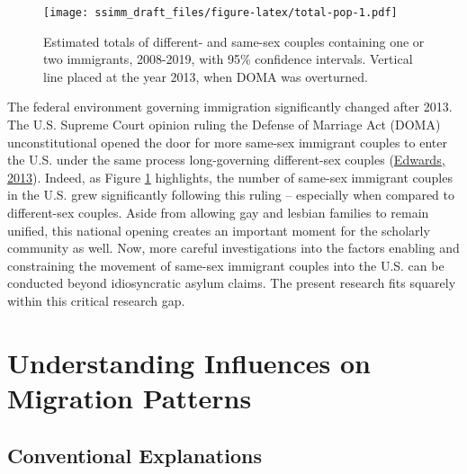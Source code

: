 \documentclass[
  11pt,
]{article}
\begin{document}
\begin{figure}
\centering
\texttt{[image: ssimm\_draft\_files/figure-latex/total-pop-1.pdf]}
\caption{\label{fig:total-pop}Estimated totals of different- and same-sex couples containing one or two immigrants, 2008-2019, with 95\% confidence intervals. Vertical line placed at the year 2013, when DOMA was overturned.}
\end{figure}

The federal environment governing immigration significantly changed after 2013. The U.S. Supreme Court opinion ruling the Defense of Marriage Act (DOMA) unconstitutional opened the door for more same-sex immigrant couples to enter the U.S. under the same process long-governing different-sex couples (\protect\hyperlink{ref-edwards_2013}{Edwards, 2013}). Indeed, as Figure \ref{fig:total-pop} highlights, the number of same-sex immigrant couples in the U.S. grew significantly following this ruling -- especially when compared to different-sex couples. Aside from allowing gay and lesbian families to remain unified, this national opening creates an important moment for the scholarly community as well. Now, more careful investigations into the factors enabling and constraining the movement of same-sex immigrant couples into the U.S. can be conducted beyond idiosyncratic asylum claims. The present research fits squarely within this critical research gap.

\hypertarget{understanding-influences-on-migration-patterns}{%
\section{Understanding Influences on Migration Patterns}\label{understanding-influences-on-migration-patterns}}

\hypertarget{conventional-explanations}{%
\subsection{Conventional Explanations}\label{conventional-explanations}}
\end{document}
